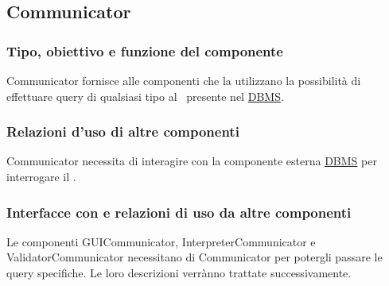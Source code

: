 \subsection{Communicator}
\subsubsection{Tipo, obiettivo e funzione del componente}
Communicator fornisce alle componenti che la utilizzano la possibilit\`a di effettuare query di qualsiasi tipo al \rp\ presente nel \underline{DBMS}.
\subsubsection{Relazioni d'uso di altre componenti}
Communicator necessita di interagire con la componente esterna \underline{DBMS} per interrogare il \rp.
\subsubsection{Interfacce con e relazioni di uso da altre componenti}
Le componenti GUICommunicator, InterpreterCommunicator e ValidatorCommunicator necessitano di Communicator per potergli passare le query specifiche. Le loro descrizioni verr\`anno trattate successivamente.
